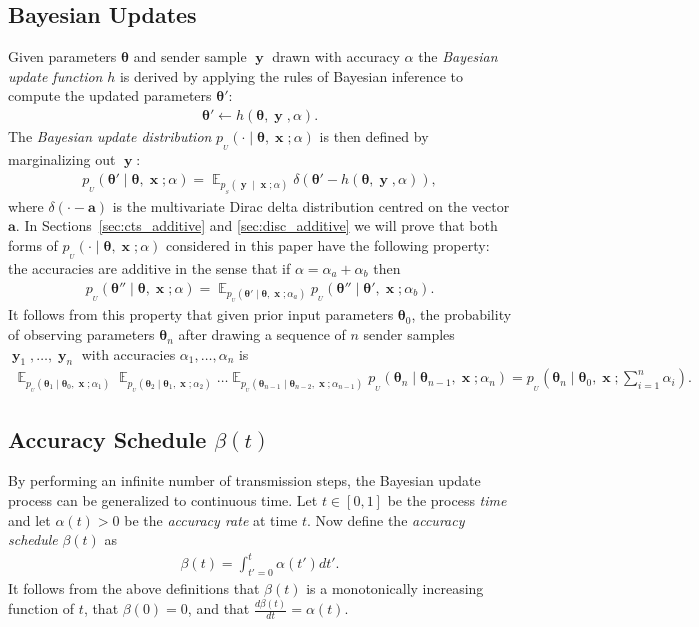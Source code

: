 \documentclass[11pt,table]{article}
\DeclareMathOperator*{\E}{\mathbb{E}}
\DeclareMathOperator{\x}{\mathbf{x}}
\DeclareMathOperator{\y}{\mathbf{y}}
\newcommand{\tidx}[2]{#1_{#2}}
\renewcommand{\vec}[1]{\boldsymbol{#1}}
\newcommand{\pars}{\theta}
\newcommand{\parsn}{\vec{\pars}}
\newcommand{\parsnt}[1]{\tidx{\parsn}{#1}}
\newcommand{\alphat}[1]{\tidx{\alpha}{#1}}
\newcommand{\yt}[1]{\tidx{\y}{#1}}
\newcommand{\0}[1]{\constvec{0}{#1}}
\newcommand{\1}[1]{\constvec{1}{#1}}
\newcommand{\sender}[2]{p_{_S}\left(#1 \mid #2\right)}
\newcommand{\update}{p_{_U}}
\begin{document}
\subsection{Bayesian Updates}
Given parameters $\parsn$ and sender sample $\y$ drawn with accuracy $\alpha$ the \emph{Bayesian update function} $h$ is derived by applying the rules of Bayesian inference to compute the updated parameters $\parsn'$: 
\begin{align}
\parsn' \leftarrow h(\parsn, \y, \alpha).
\end{align} 
The \emph{Bayesian update distribution} $\update(\cdot \mid \parsn, \x; \alpha)$ is then defined by marginalizing out $\y$:
\begin{align}
\update(\parsn' \mid \parsn, \x; \alpha) = \E_{\sender{\y}{\x;\alpha}} \delta \left(\parsn' -h(\parsn, \y, \alpha) \right),\label{param_update_dist}
\end{align}
where $\delta \left(\cdot -\vec{a}\right)$ is the multivariate Dirac delta distribution centred on the vector $\vec{a}$.
In Sections~\ref{sec:cts_additive} and \ref{sec:disc_additive} we will prove that both forms of $\update(\cdot \mid \parsn, \x; \alpha)$ considered in this paper have the following property: the accuracies are additive in the sense that if $\alpha = \alpha_a + \alpha_b$ then
\begin{align}
\update(\parsn'' \mid \parsn, \x; \alpha) = \E_{\update(\parsn' \mid \parsn, \x; \alpha_a)} \update(\parsn'' \mid \parsn', \x; \alpha_b)\label{additive}.
\end{align}
It follows from this property that given prior input parameters $\parsnt{0}$, the probability of observing parameters $\parsnt{n}$ after drawing a sequence of $n$ sender samples $\yt{1},\dots,\yt{n}$ with accuracies $\alpha_1,\dots,\alpha_n$ is
\begin{align}
\E_{\update(\parsnt{1}\mid\parsnt{0},\x;\alphat{1})}\E_{\update(\parsnt{2}\mid\parsnt{1},\x;\alphat{2})}\dots\E_{\update(\parsnt{n-1}\mid\parsnt{n-2},\x;\alphat{n-1})}\update(\parsnt{n} \mid \parsnt{n-1},\x;\alphat{n} ) = \update\left(\parsnt{n} \mid \parsnt{0}, \x; \sum_{i=1}^n \alphat{i}\right).
\label{updateseq}
\end{align}
\subsection{Accuracy Schedule \texorpdfstring{$\beta(t)$}{}}
By performing an infinite number of transmission steps, the Bayesian update process can be generalized to continuous time.
Let $t \in [0,1]$ be the process \textit{time} and let $\alpha(t) > 0$ be the \emph{accuracy rate} at time $t$.
Now define the \emph{accuracy schedule} $\beta(t)$ as 
\begin{align}
\beta(t) = \int_{t'=0}^{t} \alpha(t') dt'.
\end{align}
It follows from the above definitions that $\beta(t)$ is a monotonically increasing function of $t$, that $\beta(0) = 0$, and that $\frac{d\beta(t)}{dt} = \alpha(t)$.
\end{document}
